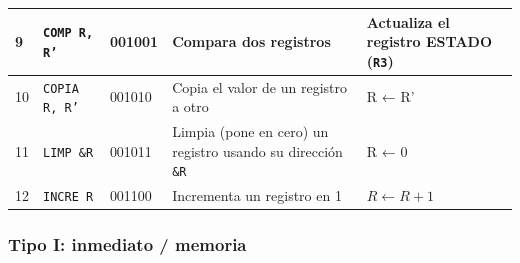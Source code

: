\documentclass{article}
\begin{document}
\begin{longtable}{|p{}|p{}|p{}|p{}|p{}|}
  \hline
  9               & \texttt{COMP R, R'}         & 001001                          & Compara dos registros                                              & Actualiza el registro ESTADO (\texttt{R3}) \\
  \hline
  10              & \texttt{COPIA R, R'}        & 001010                          & Copia el valor de un registro a otro                               & R ← R'                                     \\
  \hline
  11              & \texttt{LIMP \&R}           & 001011                          & Limpia (pone en cero) un registro usando su dirección \texttt{\&R} & R ← 0                                      \\
  \hline
  12              & \texttt{INCRE R}            & 001100                          & Incrementa un registro en 1                                        & $R \leftarrow R + 1$                       \\
  \hline
\end{longtable}

\subsubsection{Tipo I: \textbf{inmediato / memoria}}
\end{document}
